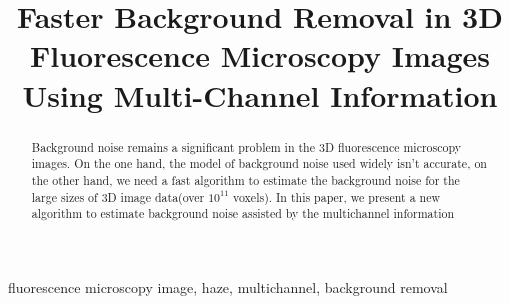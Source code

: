 \documentclass{article}
\title{ Faster Background Removal in 3D Fluorescence Microscopy Images Using Multi-Channel Information}
\begin{document}
%
\maketitle
%
\begin{abstract}
Background noise remains a significant problem in the 3D fluorescence microscopy images. On the one hand, the model of background noise used widely isn't accurate, on the other hand, we need a fast algorithm to estimate the background noise for the large sizes of 3D image data(over $10^{11}$ voxels). In this paper, we present a new algorithm to estimate background noise assisted by the multichannel information\\
\end{abstract}
%
\begin{keywords}
fluorescence microscopy image, haze, multichannel, background removal
\end{keywords}
%
\end{document}
